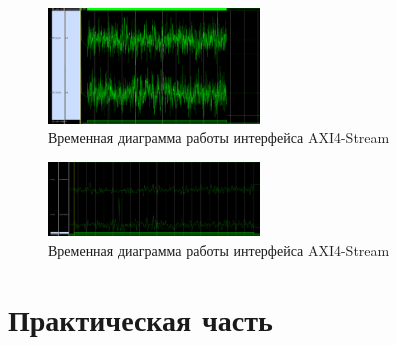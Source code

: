 \begin{figure}[h]
	\centering
	\includegraphics[width=0.5\textwidth]{image/lfm_with_noise.png}
	\caption{Временная диаграмма работы интерфейса AXI4-Stream}
	\label{fft_result}
\end{figure}
	
\begin{figure}[h]
	\centering
	\includegraphics[width=0.5\textwidth]{image/correl_with_noise.png}
	\caption{Временная диаграмма работы интерфейса AXI4-Stream}
	\label{fft_detailed_implem}
\end{figure}

\section{Практическая часть}


